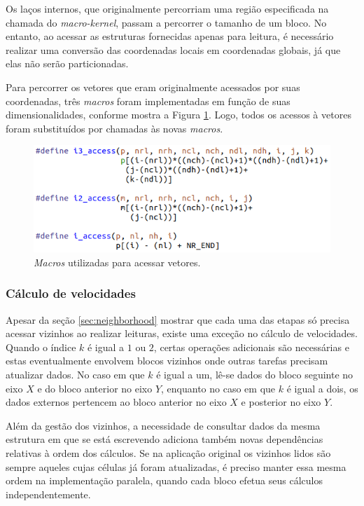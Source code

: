 \documentclass[cic,tc]{iiufrgs}
\begin{document}
Os laços internos, que originalmente percorriam uma região especificada na chamada do \textit{macro-kernel}, passam a percorrer o
tamanho de um bloco. No entanto, ao acessar as estruturas fornecidas apenas para leitura, é necessário realizar uma conversão das
coordenadas locais em coordenadas globais, já que elas não serão particionadas.

Para percorrer os vetores que eram originalmente acessados por suas coordenadas, três \textit{macros} foram implementadas em função
de suas dimensionalidades, conforme mostra a Figura \ref{fig:access}. Logo, todos os acessos à vetores foram substituídos por
chamadas às novas \textit{macros}.

\begin{figure}[!htb]
  \caption{\textit{Macros} utilizadas para acessar vetores.}
    \begin{center} 
      \includegraphics[width=34em]{access}
    \end{center}
    \label{fig:access}
\end{figure}

\subsubsection{Cálculo de velocidades}
Apesar da seção \ref{sec:neighborhood} mostrar que cada uma das etapas só precisa acessar vizinhos ao realizar leituras, existe uma
exceção no cálculo de velocidades. Quando o índice $k$ é igual a $1$ ou $2$, certas operações adicionais são necessárias e estas
eventualmente envolvem blocos vizinhos onde outras tarefas precisam atualizar dados. No caso em que $k$ é igual a um, lê-se dados
do bloco seguinte no eixo $X$ e do bloco anterior no eixo $Y$, enquanto no caso em que $k$ é igual a dois, os dados externos pertencem
ao bloco anterior no eixo $X$ e posterior no eixo $Y$. 

Além da gestão dos vizinhos, a necessidade de consultar dados da mesma estrutura em que se está escrevendo adiciona também novas
dependências relativas à ordem dos cálculos. Se na aplicação original os vizinhos lidos são sempre aqueles cujas células já
foram atualizadas, é preciso manter essa mesma ordem na implementação paralela, quando cada bloco efetua seus cálculos independentemente.
\end{document}

